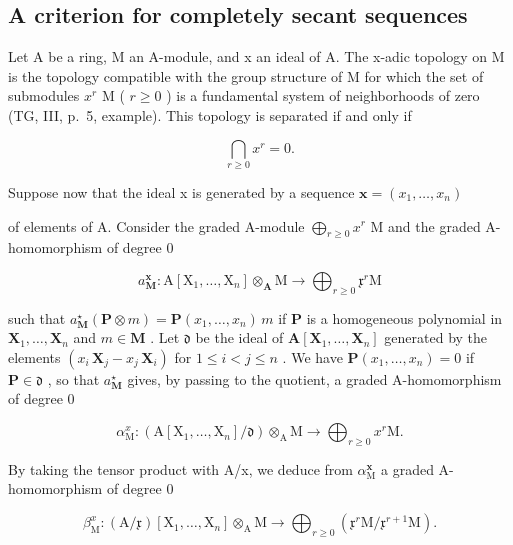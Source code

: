 \subsection{A criterion for completely secant sequences}

Let A be a ring, M an A-module, and x an ideal of A. The x-adic topology on M is the topology compatible with the group structure of M for which the set of submodules \(x^{r}\) M ( \(r \geqslant 0\) ) is a fundamental system of neighborhoods of zero (TG, III, p.~5, example). This topology is separated if and only if

\[
\bigcap_ {r \geqslant 0} x ^ {r} = 0.
\]

Suppose now that the ideal x is generated by a sequence \(\boldsymbol{x}=(x_{1},\ldots,x_{n})\)

of elements of A. Consider the graded A-module \(\bigoplus_{r\geqslant 0}x^{r}\) M and the graded A-homomorphism of degree 0

\[
a _ {\mathbf {M}} ^ {\mathbf {x}}: \mathrm{A} [ \mathrm{X} _ {1}, \dots , \mathrm{X} _ {n} ] \otimes_ {\mathbf {A}} \mathrm{M} \rightarrow \bigoplus_ {r \geqslant 0} \mathfrak {x} ^ {r} \mathrm{M}
\]

such that \(a_{\mathbf{M}}^{\star}(\mathbf{P} \otimes m) = \mathbf{P}(x_1, \ldots, x_n) \, m\) if \(\mathbf{P}\) is a homogeneous polynomial in \(\mathbf{X}_1, \ldots, \mathbf{X}_n\) and \(m \in \mathbf{M}\) . Let \(\mathfrak{d}\) be the ideal of \(\mathbf{A}[\mathbf{X}_1, \ldots, \mathbf{X}_n]\) generated by the elements \((x_i \, \mathbf{X}_j - x_j \, \mathbf{X}_i)\) for \(1 \leqslant i < j \leqslant n\) . We have \(\mathbf{P}(x_1, \ldots, x_n) = 0\) if \(\mathbf{P} \in \mathfrak{d}\) , so that \(a_{\mathbf{M}}^{\star}\) gives, by passing to the quotient, a graded A-homomorphism of degree 0

\[
\alpha_ {\mathrm{M}} ^ {x}: \left(\mathrm{A} \left[ \mathrm{X} _ {1}, \dots , \mathrm{X} _ {n} \right] / \mathfrak {d}\right) \otimes_ {\mathrm{A}} \mathrm{M} \rightarrow \bigoplus_ {r \geqslant 0} x ^ {r} \mathrm{M}.
\]

By taking the tensor product with A/x, we deduce from \(\alpha_{\mathrm{M}}^{\mathbf{x}}\) a graded A-homomorphism of degree 0

\[
\beta_ {\mathrm{M}} ^ {x}: (\mathrm{A} / \mathfrak {x}) [ \mathrm{X} _ {1}, \dots , \mathrm{X} _ {n} ] \otimes_ {\mathrm{A}} \mathrm{M} \rightarrow \bigoplus_ {r \geqslant 0} (\mathfrak {x} ^ {r} \mathrm{M} / \mathfrak {x} ^ {r + 1} \mathrm{M}).
\]

